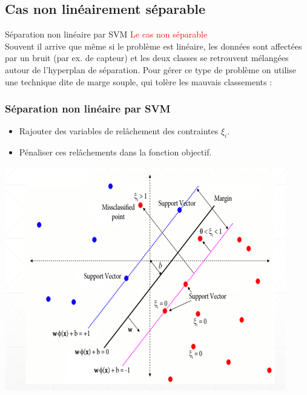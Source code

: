 \documentclass{bredelebeamer}
\begin{document}
\subsection{Cas non linéairement séparable }
\begin{frame}{Séparation non linéaire par SVM}
\textcolor{red}{Le cas non séparable}\vspace{1\baselineskip}\\
 Souvent il arrive que même si le problème est linéaire, les données sont affectées par un bruit (par ex. de capteur) et les deux classes se retrouvent mélangées autour de l’hyperplan de séparation. Pour gérer ce type de problème on utilise une technique dite de marge souple, qui tolère les mauvais classements :\\
\frametitle{Séparation non linéaire par SVM }
    \begin{minipage}{0.3\textwidth}
\begin{itemize}
      \item Rajouter des variables de relâchement des contraintes $\xi_i$.\\
      \item Pénaliser ces relâchements dans la fonction objectif.\\
\end {itemize} 
    \end{minipage}
    \begin{minipage}{0.3\textwidth}
        \includegraphics[scale=0.5]{14.png}
    \end{minipage}
\end{frame}
\end{document}
